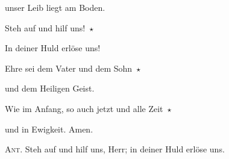 unser Leib liegt am Boden.

\noindent Steh auf und hilf uns!~$\star$~\nopagebreak

In deiner Huld erlöse uns!

\noindent Ehre sei dem Vater und dem Sohn~$\star$~\nopagebreak

und dem Heiligen Geist.

\noindent Wie im Anfang, so auch jetzt und alle Zeit~$\star$~\nopagebreak

und in Ewigkeit. Amen.

\vspace{10pt}

\noindent \textsc{Ant.} Steh auf und hilf uns, Herr; in deiner Huld erlöse uns.
